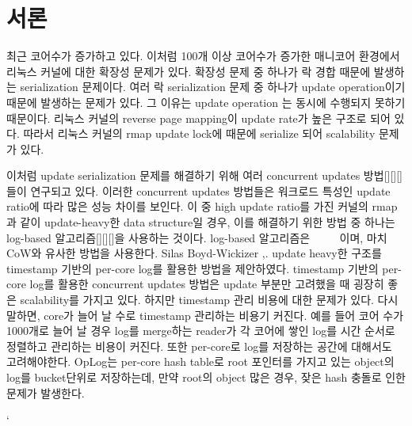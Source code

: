 \section{서론} \label{sec:introduction}


최근 코어수가 증가하고 있다.
이처럼 100개 이상 코어수가 증가한 매니코어 환경에서 리눅스 커널에 대한 확장성 문제가 있다. 
확장성 문제 중 하나가 락 경합 때문에 발생하는 serialization 문제이다.
여러 락 serialization 문제 중 하나가 update operation이기 때문에 발생하는 문제가 있다. 그 이유는
update operation 는 동시에 수행되지 못하기 때문이다.
리눅스 커널의 reverse page mapping이 update rate가 높은 구조로 되어 있다.
따라서 리눅스 커널의 rmap update lock에 때문에 serialize 되어 scalability 문제가 있다.


이처럼 update serialization 문제를 해결하기 위해 여러 concurrent updates 방법[][][] 들이 연구되고
있다. 
이러한 concurrent updates 방법들은 워크로드 특성인 update ratio에 따라 많은 성능 차이를 보인다.
이 중 high update ratio를 가진 커널의 rmap과 같이 update-heavy한 data structure일 경우, 이를
해결하기 위한 방법 중 하나는 log-based 알고리즘[][][]을 사용하는 것이다. 
log-based 알고리즘은 ~~~~ 이며, 마치 CoW와 유사한 방법을 사용한다. 
Silas Boyd-Wickizer ,. update heavy한 구조를 timestamp 기반의 per-core log를 활용한
방법을 제안하였다.
timestamp 기반의 per-core log를 활용한 concurrent updates 방법은 update 부분만
고려했을 때 굉장히 좋은 scalability를 가지고 있다. 하지만 timestamp 관리 비용에 대한 문제가 있다.
다시 말하면, core가 늘어 날 수로 timestamp 관리하는 비용기 커진다. 
예를 들어 코어 수가 1000개로 늘어 날 경우 log를 merge하는 reader가 각 코어에 쌓인 log를 시간 순서로 정렬하고
관리하는 비용이 커진다.
또한 per-core로 log를 저장하는 공간에 대해서도 고려해야한다. OpLog는 per-core hash table로 root 포인터를
가지고 있는 object의 log를 bucket단위로 저장하는데, 만약 root의 object 많은 경우, 잦은 hash
충돌로 인한 문제가 발생한다.


`



